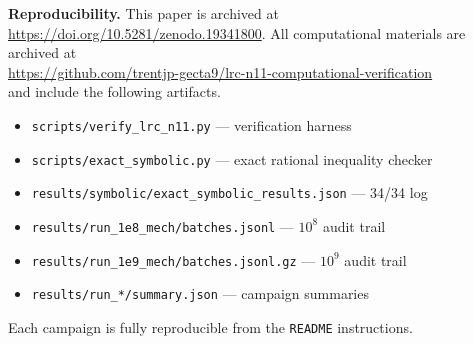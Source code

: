 \documentclass[12pt,a4paper]{amsart}
\theoremstyle{definition}
\theoremstyle{remark}
\begin{document}
\medskip
\noindent\textbf{Reproducibility.}
This paper is archived at \url{https://doi.org/10.5281/zenodo.19341800}.
All computational materials are archived at\\
\url{https://github.com/trentjp-gecta9/lrc-n11-computational-verification}\\
and include the following artifacts.
\begin{itemize}\setlength{\itemsep}{1pt}
  \item \texttt{scripts/verify\_lrc\_n11.py} --- verification harness
  \item \texttt{scripts/exact\_symbolic.py} --- exact rational inequality checker
  \item \texttt{results/symbolic/exact\_symbolic\_results.json} --- 34/34 log
  \item \texttt{results/run\_1e8\_mech/batches.jsonl} --- $10^8$ audit trail
  \item \texttt{results/run\_1e9\_mech/batches.jsonl.gz} --- $10^9$ audit trail
  \item \texttt{results/run\_*/summary.json} --- campaign summaries
\end{itemize}
Each campaign is fully reproducible from the \texttt{README} instructions.
\end{document}
